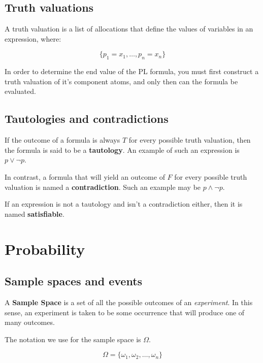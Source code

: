 \documentclass{article}
\begin{document}
\subsection{Truth valuations}

A truth valuation is a list of allocations that define the values of variables
in an expression, where:

\[
	\{p_1=x_1,\dots, p_n=x_n\}
\]


In order to determine the end value of the PL formula, you must first construct
a truth valuation of it's component atoms, and only then can the formula be
evaluated.

\subsection{Tautologies and contradictions}

If the outcome of a formula is always $T$ for every possible truth valuation,
then the formula is said to be a {\bf tautology}. An example of such an
expression is $p \vee \neg p$.

In contrast, a formula that will yield an outcome of $F$ for every possible
truth valuation is named a {\bf contradiction}. Such an example may be $p \wedge
\neg p$.

If an expression is not a tautology and isn't a contradiction either, then it is
named {\bf satisfiable}.


\section{Probability}

\subsection{Sample spaces and events}

A {\bf Sample Space} is a set of all the possible outcomes of an {\it
experiment}. In this sense, an experiment is taken to be some occurrence that
will produce one of many outcomes.

The notation we use for the sample space is $\Omega$.

\[
	\Omega = \{\omega_1, \omega_2, \ldots, \omega_n\}
\]
\end{document}
